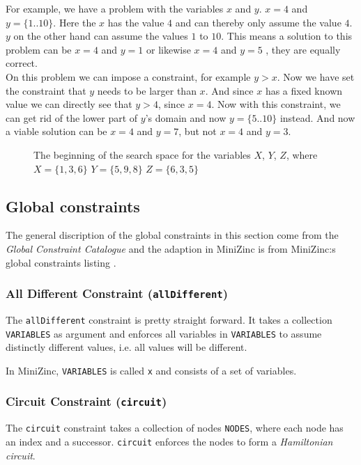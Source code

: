 \begin{framed}
For example, we have a problem with the variables $x$ and $y$. $x = 4$ and $y = \{1..10\}$. Here the $x$ has the value $4$ and can thereby only assume the value $4$. $y$ on the other hand can assume the values $1$ to $10$. This means a solution to this problem can be $x = 4$ and $y = 1$ or likewise $x = 4$ and $y = 5$ , they are equally correct.\\
On this problem we can impose a constraint, for example $y > x$. Now we have set the constraint that $y$ needs to be larger than $x$. And since $x$ has a fixed known value we can directly see that $y > 4$, since $x = 4$. Now with this constraint, we can get rid of the lower part of $y$'s domain and now $y = \{5..10\}$ instead. And now a viable solution can be $x = 4$ and $y = 7$, but not $x = 4$ and $y = 3$.
\end{framed}

\begin{figure}
  \caption{The beginning of the search space for the variables $X$, $Y$, $Z$, where $X=\{1,3,6\}$ $Y=\{5,9,8\}$ $Z=\{6,3,5\}$}
  \label{fig:search_space}
\end{figure}

\subsection{Global constraints}
The general discription of the global constraints in this section come from the \emph{Global Constraint Catalogue} \cite{global_constraint_catalogue} and the adaption in MiniZinc is from MiniZinc:s global constraints listing \cite{mz_global_constraints}.

\subsubsection{All Different Constraint (\texttt{allDifferent})}
The \texttt{allDifferent} constraint is pretty straight forward. It takes a collection \texttt{VARIABLES} as argument and enforces all variables in \texttt{VARIABLES} to assume distinctly different values, i.e. all values will be different.

In MiniZinc, \texttt{VARIABLES} is called \texttt{x} and consists of a set of variables.

\subsubsection{Circuit Constraint (\texttt{circuit})}
The \texttt{circuit} constraint takes a collection of nodes \texttt{NODES}, where each node has an index and a successor. \texttt{circuit} enforces the nodes to form a \emph{Hamiltonian circuit}.


